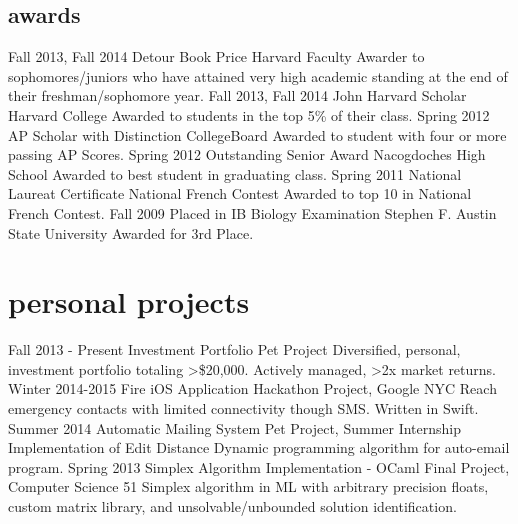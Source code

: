 \documentclass[]{friggeri-cv} %
\begin{document}
\begin{detailed}
\section{awards}

\begin{entrylist}
\entry
{Fall 2013, Fall 2014}
{Detour Book Price}
{Harvard Faculty}
{Awarder to sophomores/juniors who have attained very high academic standing at the end of their freshman/sophomore year.}
\entry
{Fall 2013, Fall 2014}
{John Harvard Scholar}
{Harvard College}
{Awarded to students in the top 5\% of their class.}
\entry
{Spring 2012}
{AP Scholar with Distinction}
{CollegeBoard}
{Awarded to student with four or more passing AP Scores.}
\entry
{Spring 2012}
{Outstanding Senior Award}
{Nacogdoches High School}
{Awarded to best student in graduating class.}
\entry
{Spring 2011}
{National Laureat Certificate}
{National French Contest}
{Awarded to top 10 in National French Contest.}
\entry
{Fall 2009}
{Placed in IB Biology Examination}
{Stephen F. Austin State University}
{Awarded for 3rd Place.}
\end{entrylist}
\end{detailed}



\section{personal projects}

\entry
{Fall 2013 - Present}
{Investment Portfolio}
{Pet Project}
{Diversified, personal, investment portfolio totaling >\$20,000. Actively managed, >2x market returns.}
\entry
{Winter 2014-2015}
{Fire iOS Application}
{Hackathon Project, Google NYC}
{Reach emergency contacts with limited connectivity though SMS. Written in Swift.}
\entry
{Summer 2014}
{Automatic Mailing System}
{Pet Project, Summer Internship}
{Implementation of Edit Distance Dynamic programming algorithm for auto-email program.}
\entry
{Spring 2013}
{Simplex Algorithm Implementation - OCaml}
{Final Project, Computer Science 51}
{Simplex algorithm in ML with arbitrary precision floats, custom matrix library, and unsolvable/unbounded solution identification.}
\end{document}
